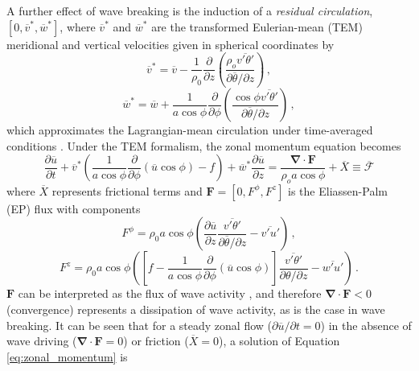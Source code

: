 A further effect of wave breaking is the induction of a \emph{residual
  circulation}, $[0, \overline{v}^*, \overline{w}^*]$, where $\overline{v}^*$ and
$\overline{w}^*$ are the transformed Eulerian-mean (TEM) meridional and vertical
velocities given in spherical coordinates by
\begin{equation}
  \overline{v}^* = \overline{v} - \frac{1}{\rho_0}\frac{\partial}{\partial z}
  \left(\frac{\rho_o\overline{v'\theta'}}{\partial\overline{\theta}/{\partial z}}\right) \, , 
\end{equation}
\begin{equation}
\overline{w}^* = \overline{w} + \frac{1}{a\cos\phi}\frac{\partial}{\partial\phi}
\left(\frac{\cos\phi\overline{v'\theta'}}{\partial\overline{\theta}/{\partial
      z}}\right) \, ,
\end{equation}
which approximates the Lagrangian-mean circulation under time-averaged
conditions \citep{Andrews1976,Dunkerton1978,Holton1990}. Under the TEM
formalism, the zonal momentum equation becomes
\begin{equation}
\frac{\partial\overline{u}}{\partial t} +
\overline{v}^*\left(\frac{1}{a\cos\phi}\frac{\partial}{\partial\phi}(\overline{u}\cos{\phi})
  - f \right) + \overline{w}^*\frac{\partial\overline{u}}{\partial z} =
\frac{\mathbf{\nabla \cdot F}}{\rho_oa\cos\phi} + \overline{X} \equiv \overline{\mathcal{F}}
\label{eq:zonal_momentum}
\end{equation}
where $\overline{X}$ represents frictional terms and $\mathbf{F}=[0,F^\phi,F^z]$
is the Eliassen-Palm (EP) flux with components
\begin{equation}
F^\phi = \rho_0a\cos\phi\left(\frac{\partial\overline{u}}{\partial
    z}\frac{\overline{v'\theta'}}{\partial\overline{\theta}/\partial z} -
  \overline{v'u'}\right) \, ,
\end{equation}
\begin{equation}
F^z =
\rho_0a\cos\phi\left(\left[f-\frac{1}{a\cos\phi}\frac{\partial}{\partial\phi}(\overline{u}\cos\phi)\right]\frac{\overline{v'\theta'}}{\partial\theta/\partial
      z} - \overline{w'u'}\right) \, .
\end{equation}
$\mathbf{F}$ can be interpreted as the flux of wave activity
\citep{Andrews1987}, and therefore $\mathbf{\nabla\cdot F}<0$ (convergence)
represents a dissipation of wave activity, as is the case in wave breaking. It
can be seen that for a steady zonal flow ($\partial\overline{u}/\partial t = 0$)
in the absence of wave driving ($\mathbf{\nabla\cdot F} = 0$) or friction
($\overline{X} = 0$), a solution of Equation \ref{eq:zonal_momentum} is
